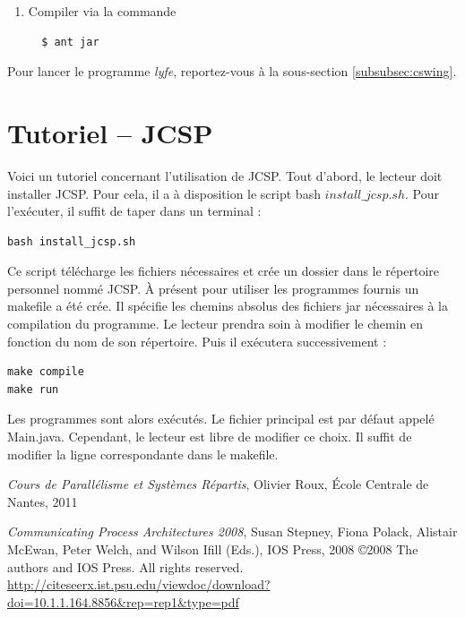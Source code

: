 \documentclass[a4paper,11pt,french]{report}
\begin{document}
\begin{enumerate}
  
\item Compiler via la commande
  \begin{verbatim} 
  $ ant jar
  \end{verbatim}  
\end{enumerate}

Pour lancer le programme \emph{lyfe}, reportez-vous à la sous-section \vref{subsubsec:cswing}.



\chapter[Tutoriel JCSP]{Tutoriel -- JCSP}

Voici un tutoriel concernant l'utilisation de JCSP. Tout d'abord, le lecteur doit installer JCSP. Pour cela, il a à disposition le script bash $install\_{}jcsp.sh$. Pour l'exécuter, il suffit de taper dans un terminal :

\begin{lstlisting}[frame=trBL]
bash install_jcsp.sh
\end{lstlisting}

Ce script télécharge les fichiers nécessaires et crée un dossier dans le répertoire personnel nommé JCSP. \`A présent pour utiliser les programmes  fournis un makefile a été crée. Il spécifie les chemins absolus des fichiers jar nécessaires à la compilation du programme. Le lecteur prendra soin à modifier le chemin en fonction du nom de son répertoire. Puis il exécutera successivement :

\begin{lstlisting}[frame=trBL]
make compile
make run
\end{lstlisting}

Les programmes sont alors exécutés. Le fichier principal est par défaut appelé Main.java. Cependant, le lecteur est libre de modifier ce choix. Il suffit de modifier la ligne correspondante dans le makefile.

\begin{thebibliography}{Cpa2008}
 {\textit{Cours de Parallélisme et Systèmes Répartis}, Olivier Roux, \'Ecole Centrale de Nantes, 2011}

 {\textit{Communicating Process Architectures 2008}, Susan Stepney, Fiona Polack, Alistair McEwan, Peter Welch, and Wilson Ifill (Eds.), IOS Press, 2008
\copyright 2008 The authors and IOS Press. All rights reserved.\\
\url{http://citeseerx.ist.psu.edu/viewdoc/download?doi=10.1.1.164.8856&rep=rep1&type=pdf}}
\end{thebibliography}
\end{document}
